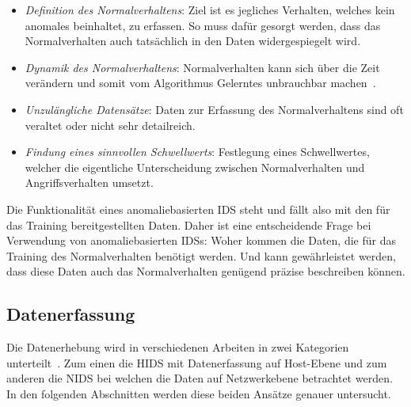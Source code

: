                 \begin{itemize}
                    \item \textit{Definition des Normalverhaltens}:
                        Ziel ist es jegliches Verhalten, welches kein anomales beinhaltet, zu erfassen.
                        So muss dafür gesorgt werden,
                        dass das Normalverhalten auch tatsächlich in den Daten widergespiegelt wird. 

                    \item \textit{Dynamik des Normalverhaltens}:
                        Normalverhalten kann sich über die Zeit verändern 
                        und somit vom Algorithmus Gelerntes unbrauchbar machen~\cite{ANOMALYSURVEY}.

                    \item \textit{Unzulängliche Datensätze}:
                        Daten zur Erfassung des Normalverhaltens sind oft veraltet oder nicht sehr detailreich. 

                    \item \textit{Findung eines sinnvollen Schwellwerts}:
                        Festlegung eines Schwellwertes, welcher die eigentliche Unterscheidung zwischen Normalverhalten und Angriffsverhalten umsetzt.
                \end{itemize}

                Die Funktionalität eines anomaliebasierten \ac{IDS} steht und fällt also mit den für das Training bereitgestellten Daten.
                Daher ist eine entscheidende Frage bei Verwendung von anomaliebasierten \acp{IDS}\@: Woher kommen die Daten, die für das Training des Normalverhalten benötigt werden.
                Und kann gewährleistet werden, dass diese Daten auch das Normalverhalten genügend präzise beschreiben können.

        \subsection{Datenerfassung}\label{sec:Datenerfassung}
            Die Datenerhebung wird in verschiedenen Arbeiten in zwei Kategorien unterteilt~\cite{IDSsurvey, IDSreview}.
            Zum einen die \ac{HIDS} mit Datenerfassung auf Host-Ebene und zum anderen die \ac{NIDS} bei welchen die Daten auf Netzwerkebene betrachtet werden.
            In den folgenden Abschnitten werden diese beiden Ansätze genauer untersucht.

